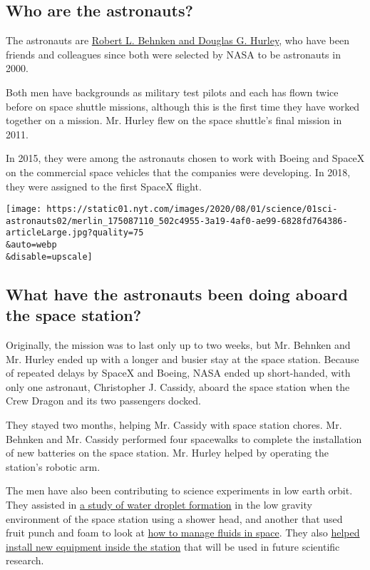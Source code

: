 \hypertarget{who-are-the-astronauts}{%
\subsection{Who are the astronauts?}\label{who-are-the-astronauts}}

The astronauts are
\href{https://www.nytimes.com/2020/05/27/science/bob-behnken-doug-hurley.html}{Robert
L. Behnken and Douglas G. Hurley}, who have been friends and colleagues
since both were selected by NASA to be astronauts in 2000.

Both men have backgrounds as military test pilots and each has flown
twice before on space shuttle missions, although this is the first time
they have worked together on a mission. Mr. Hurley flew on the space
shuttle's final mission in 2011.

In 2015, they were among the astronauts chosen to work with Boeing and
SpaceX on the commercial space vehicles that the companies were
developing. In 2018, they were assigned to the first SpaceX flight.

\texttt{[image: https://static01.nyt.com/images/2020/08/01/science/01sci-astronauts02/merlin\_175087110\_502c4955-3a19-4af0-ae99-6828fd764386-articleLarge.jpg?quality=75\\\&auto=webp\\\&disable=upscale]}

\hypertarget{what-have-the-astronauts-been-doing-aboard-the-space-station}{%
\subsection{What have the astronauts been doing aboard the space
station?}\label{what-have-the-astronauts-been-doing-aboard-the-space-station}}

Originally, the mission was to last only up to two weeks, but Mr.
Behnken and Mr. Hurley ended up with a longer and busier stay at the
space station. Because of repeated delays by SpaceX and Boeing, NASA
ended up short-handed, with only one astronaut, Christopher J. Cassidy,
aboard the space station when the Crew Dragon and its two passengers
docked.

They stayed two months, helping Mr. Cassidy with space station chores.
Mr. Behnken and Mr. Cassidy performed four spacewalks to complete the
installation of new batteries on the space station. Mr. Hurley helped by
operating the station's robotic arm.

The men have also been contributing to science experiments in low earth
orbit. They assisted in
\href{https://www.nasa.gov/mission_pages/station/research/behnken-hurley-science-scrapbook}{a
study of water droplet formation} in the low gravity environment of the
space station using a shower head, and another that used fruit punch and
foam to look at \href{https://www.youtube.com/watch?v=2Dzx6b6vSK4}{how
to manage fluids in space}. They also
\href{https://www.nasa.gov/mission_pages/station/research/behnken-hurley-science-scrapbook}{helped
install new equipment inside the station} that will be used in future
scientific research.

